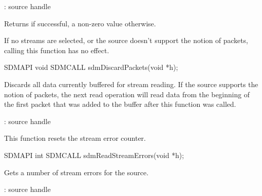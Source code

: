 \documentclass[a4paper,12pt,twoside,extrafontsizes]{memoir}
\begin{document}
\begin{funcparams}
	: source handle
\end{funcparams}

\begin{funcret}
	Returns  if successful, a non-zero value otherwise.
\end{funcret}

\begin{funcremarks}
	If no streams are selected, or the source doesn't support the notion of packets, calling this function has no effect.
\end{funcremarks}



\begin{cfuncprototype}
SDMAPI void SDMCALL sdmDiscardPackets(void *h);
\end{cfuncprototype}

\begin{funcdescr}
	Discards all data currently buffered for stream reading. If the source supports the notion of packets, the next read operation will read data from the beginning of the first packet that was added to the buffer after this function was called.
\end{funcdescr}

\begin{funcparams}
	: source handle
\end{funcparams}

\begin{funcremarks}
	This function resets the stream error counter.
\end{funcremarks}



\begin{cfuncprototype}
SDMAPI int SDMCALL sdmReadStreamErrors(void *h);
\end{cfuncprototype}

\begin{funcdescr}
	Gets a number of stream errors for the source.
\end{funcdescr}

\begin{funcparams}
	: source handle
\end{funcparams}
\end{document}
